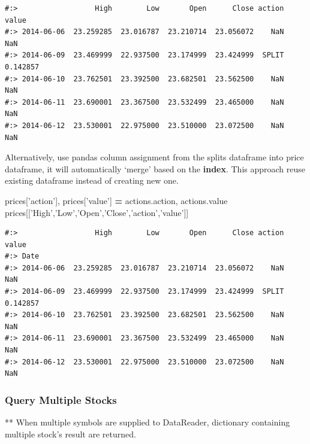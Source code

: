 \documentclass[
]{book}
\newenvironment{Shaded}{\begin{snugshade}}{\end{snugshade}}
\newcommand{\NormalTok}[1]{#1}
\newcommand{\OperatorTok}[1]{\textcolor[rgb]{0.43,0.43,0.43}{\textbf{#1}}}
\newcommand{\StringTok}[1]{\textcolor[rgb]{0.5,0.5,0.5}{#1}}
\begin{document}
\begin{verbatim}
#:>                  High        Low       Open      Close action     value
#:> 2014-06-06  23.259285  23.016787  23.210714  23.056072    NaN       NaN
#:> 2014-06-09  23.469999  22.937500  23.174999  23.424999  SPLIT  0.142857
#:> 2014-06-10  23.762501  23.392500  23.682501  23.562500    NaN       NaN
#:> 2014-06-11  23.690001  23.367500  23.532499  23.465000    NaN       NaN
#:> 2014-06-12  23.530001  22.975000  23.510000  23.072500    NaN       NaN
\end{verbatim}

Alternatively, use pandas column assignment from the splits dataframe into price dataframe, it will automatically `merge' based on the \textbf{index}. This approach reuse existing dataframe instead of creating new one.

\begin{Shaded}
\begin{Highlighting}[]
\NormalTok{prices[}\StringTok{'action'}\NormalTok{], prices[}\StringTok{'value'}\NormalTok{] }\OperatorTok{=}\NormalTok{ actions.action, actions.value}
\NormalTok{prices[[}\StringTok{'High'}\NormalTok{,}\StringTok{'Low'}\NormalTok{,}\StringTok{'Open'}\NormalTok{,}\StringTok{'Close'}\NormalTok{,}\StringTok{'action'}\NormalTok{,}\StringTok{'value'}\NormalTok{]]}
\end{Highlighting}
\end{Shaded}

\begin{verbatim}
#:>                  High        Low       Open      Close action     value
#:> Date                                                                   
#:> 2014-06-06  23.259285  23.016787  23.210714  23.056072    NaN       NaN
#:> 2014-06-09  23.469999  22.937500  23.174999  23.424999  SPLIT  0.142857
#:> 2014-06-10  23.762501  23.392500  23.682501  23.562500    NaN       NaN
#:> 2014-06-11  23.690001  23.367500  23.532499  23.465000    NaN       NaN
#:> 2014-06-12  23.530001  22.975000  23.510000  23.072500    NaN       NaN
\end{verbatim}

\hypertarget{query-multiple-stocks}{%
\subsubsection{Query Multiple Stocks}\label{query-multiple-stocks}}

** When multiple symbols are supplied to DataReader, dictionary containing multiple stock's result are returned.
\end{document}
